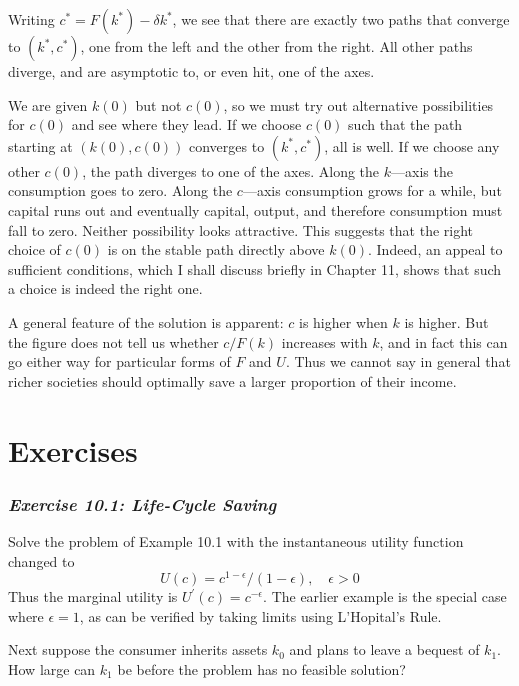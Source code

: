 Writing $c^* = F(k^*) - \delta k^*$, we see that there are exactly two paths that converge to $(k^*, c^*)$, one from the left and the other from the right. All other paths diverge, and are asymptotic to, or even hit, one of the axes.

We are given $k(0)$ but not $c(0)$, so we must try out alternative possibilities for $c(0)$ and see where they lead. If we choose $c(0)$ such that the path starting at $(k(0), c(0))$ converges to $(k^*, c^*)$, all is well. If we choose any other $c(0)$, the path diverges to one of the axes. Along the $k$—axis the consumption goes to zero. Along the $c$—axis consumption grows for a while, but capital runs out and eventually capital, output, and therefore consumption must fall to zero. Neither possibility looks attractive. This suggests that the right choice of $c(0)$ is on the stable path directly above $k(0)$. Indeed, an appeal to sufficient conditions, which I shall discuss briefly in Chapter 11, shows that such a choice is indeed the right one.

A general feature of the solution is apparent: $c$ is higher when $k$ is higher. But the figure does not tell us whether $c/F(k)$ increases with $k$, and in fact this can go either way for particular forms of $F$ and $U$. Thus we cannot say in general that richer societies should optimally save a larger proportion of their income.

\section*{Exercises}

\subsubsection*{\textit{Exercise 10.1: Life-Cycle Saving}}

Solve the problem of Example 10.1 with the instantaneous utility function changed to 
\begin{equation*}
 U(c) = c^{1-\epsilon} / (1-\epsilon), \quad \epsilon > 0
\end{equation*}
Thus the marginal utility is $U^\prime(c) = c^{-\epsilon}$. The earlier example is the special case where $\epsilon =1$, as can be verified by taking limits using L'Hopital's Rule.

Next suppose the consumer inherits assets $k_0$ and plans to leave a bequest of $k_1$. How large can $k_1$ be before the problem has no feasible solution?


